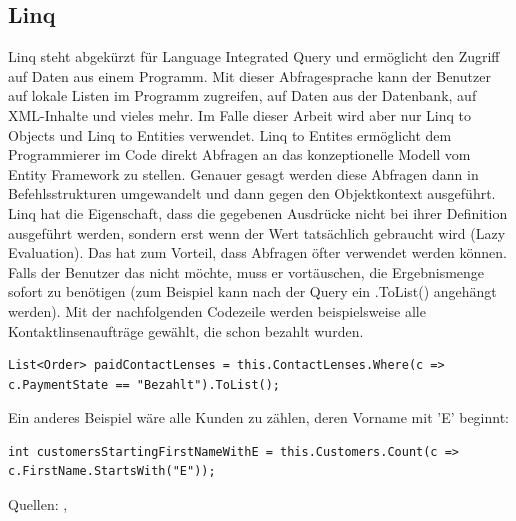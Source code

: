 \subsection{Linq}
Linq steht abgekürzt für Language Integrated Query und ermöglicht den Zugriff auf Daten aus einem Programm. Mit dieser Abfragesprache kann der Benutzer auf lokale Listen im Programm zugreifen, auf Daten aus der Datenbank, auf XML-Inhalte und vieles mehr. Im Falle dieser Arbeit wird aber nur Linq to Objects und Linq to Entities verwendet. Linq to Entites ermöglicht dem Programmierer im Code direkt Abfragen an das konzeptionelle Modell vom Entity Framework zu stellen. Genauer gesagt werden diese Abfragen dann in Befehlsstrukturen umgewandelt und dann gegen den Objektkontext ausgeführt.
\newline Linq hat die Eigenschaft, dass die gegebenen Ausdrücke nicht bei ihrer Definition ausgeführt werden, sondern erst wenn der Wert tatsächlich gebraucht wird (Lazy Evaluation). Das hat zum Vorteil, dass Abfragen öfter verwendet werden können. Falls der Benutzer das nicht möchte, muss er vortäuschen, die Ergebnismenge sofort zu benötigen (zum Beispiel kann nach der Query ein .ToList() angehängt werden).
\newline Mit der nachfolgenden Codezeile werden beispielsweise alle Kontaktlinsenaufträge gewählt, die schon bezahlt wurden.
\begin{lstlisting}
List<Order> paidContactLenses = this.ContactLenses.Where(c => c.PaymentState == "Bezahlt").ToList();
\end{lstlisting}
Ein anderes Beispiel wäre alle Kunden zu zählen, deren Vorname mit 'E' beginnt:
\begin{lstlisting}
int customersStartingFirstNameWithE = this.Customers.Count(c => c.FirstName.StartsWith("E"));
\end{lstlisting}
Quellen: \cite{wikipedia_linq_2018}, \cite{microsoft_linq_2018}
